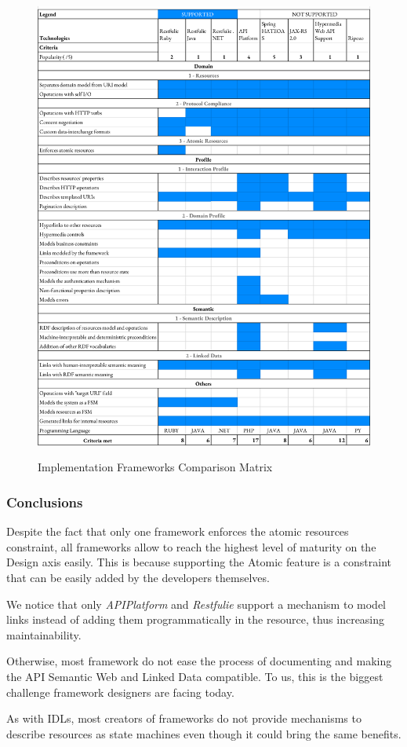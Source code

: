 \begin{figure}[t]
\caption{Implementation Frameworks Comparison Matrix}
\includegraphics[width=1\textwidth]{figures/frameworks.png}
\label{frameworks-matrix}
\end{figure}

\subsubsection*{Conclusions}

Despite the fact that only one framework enforces the atomic resources constraint, all frameworks allow to reach the highest level of maturity on the Design axis easily. This is because supporting the Atomic feature is a constraint that can be easily added by the developers themselves. 

We notice that only \textit{APIPlatform} and \textit{Restfulie} support a mechanism to model links instead of adding them programmatically in the resource, thus increasing maintainability.

Otherwise, most framework do not ease the process of documenting and making the API Semantic Web and Linked Data compatible. To us, this is the biggest challenge framework designers are facing today.

As with IDLs, most creators of frameworks do not provide mechanisms to describe resources as state machines even though it could bring the same benefits.
